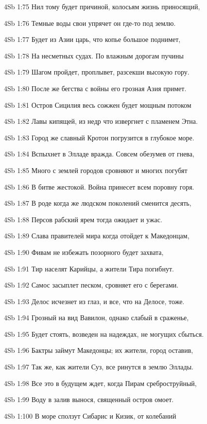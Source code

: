 \vs 4Sb 1:75 Нил тому будет причиной, колосьям жизнь приносящий,  

\vs 4Sb 1:76 Темные воды свои упрячет он где-то под землю.

\vs 4Sb 1:77 Будет из Азии царь, что копье большое поднимет, 

\vs 4Sb 1:78 На несметных судах. По влажным дорогам пучины 

\vs 4Sb 1:79 Шагом пройдет, проплывет, разсекши высокую гору. 

\vs 4Sb 1:80 После же бегства с войны его грозная Азия примет.

\vs 4Sb 1:81 Остров Сицилия весь сожжен будет мощным потоком 

\vs 4Sb 1:82 Лавы кипящей, из недр что извергнет с пламенем Этна. 

\vs 4Sb 1:83 Город же славный Кротон погрузится в глубокое море.

\vs 4Sb 1:84 Вспыхнет в Элладе вражда. Совсем обезумев от гнева, 

\vs 4Sb 1:85 Много с землей городов сровняют и многих погубят 

\vs 4Sb 1:86 В битве жестокой. Война принесет всем поровну горя.

\vs 4Sb 1:87 В роде когда же людском поколений сменится десять, 

\vs 4Sb 1:88 Персов рабский ярем тогда ожидает и ужас.

\vs 4Sb 1:89 Слава правителей мира когда отойдет к Македонцам,

\vs 4Sb 1:90 Фивам не избежать позорного будет захвата, 

\vs 4Sb 1:91 Тир населят Карийцы, а жители Тира погибнут.

\vs 4Sb 1:92 Самос засыплет песком, сровняет его с берегами.

\vs 4Sb 1:93 Делос исчезнет из глаз, и все, что на Делосе, тоже.

\vs 4Sb 1:94 Грозный на вид Вавилон, однако слабый в сраженье,

\vs 4Sb 1:95 Будет стоять, возведен на надеждах, не могущих сбыться. 

\vs 4Sb 1:96 Бактры займут Македонцы; их жители, город оставив,

\vs 4Sb 1:97 Так же, как жители Суз, все ринутся в землю Эллады.

\vs 4Sb 1:98 Все это в будущем ждет, когда Пирам среброструйный, 

\vs 4Sb 1:99 Воду в залив вынося, священный остров омоет. 

\vs 4Sb 1:100 В море сползут Сибарис и Кизик, от колебаний 

